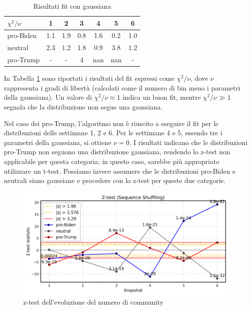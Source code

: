 \documentclass[sigchi]{acmart}
\begin{document}
\begin{table}[ht]
    \centering
        \begin{tabular}{l|c c c c c c}
        \hline
        \hline
         $\chi^2/\nu$ & 1 & 2 & 3 & 4 & 5 & 6 \\
        \hline
        \hline
        pro-Biden & 1.1 & 1.9 & 0.8 & 1.6 & 0.2 & 1.0  \\
        \hline
        neutral & 2.3 & 1.2 & 1.8 & 0.9 & 3.8 & 1.2  \\
        \hline
        pro-Trump & - & - & 4 & nan & nan & -  \\
        \hline
        \end{tabular}
    \caption{Risultati fit con gaussiana}
    \label{tab:gauss_fit}
\end{table}

In Tabella \ref{tab:gauss_fit} sono riportati i risultati del fit espressi come $\chi^2/\nu$, dove $\nu$ rappresenta i gradi di libertà (calcolati come il numero di bin meno i parametri della gaussiana). Un valore di $\chi^2/\nu \approx 1$ indica un buon fit, mentre $\chi^2/\nu \gg 1$ segnala che la distribuzione non segue una gaussiana.

Nel caso dei pro-Trump, l'algoritmo non è riuscito a eseguire il fit per le distribuzioni delle settimane 1, 2 e 6. Per le settimane 4 e 5, essendo tre i parametri della gaussiana, si ottiene $\nu = 0$. I risultati indicano che le distribuzioni pro-Trump non seguono una distribuzione gaussiana, rendendo lo z-test non applicabile per questa categoria; in questo caso, sarebbe più appropriato utilizzare un t-test. Possiamo invece assumere che le distribuzioni pro-Biden e neutrali siano gaussiane e procedere con lo z-test per queste due categorie.

\begin{figure}[h]
    \centering
    \includegraphics[width=\linewidth]{img/Ztest_Sequence_shuffling.png}
    \caption{z-test dell'evoluzione del  numero di community} \label{fig:z-test}
\end{figure}
\end{document}
